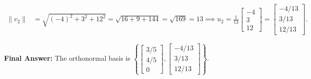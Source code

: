 \documentclass[11pt, letterpaper]{article}
\theoremstyle{definition}
\theoremstyle{remark}
\begin{document}
\begin{enumerate}[label=\textbf{Step \arabic*:}]
\begin{align*}
        \|v_2\| &= \sqrt{(-4)^2 + 3^2 + 12^2} = \sqrt{16 + 9 + 144} = \sqrt{169} = 13 \implies u_2 = \frac{1}{13}\begin{bmatrix} -4 \\ 3 \\ 12 \end{bmatrix} = \begin{bmatrix} -4/13 \\ 3/13 \\ 12/13 \end{bmatrix}.
    \end{align*}
\end{enumerate}
\textbf{Final Answer:} The orthonormal basis is $\left\{ \begin{bmatrix} 3/5 \\ 4/5 \\ 0 \end{bmatrix}, \begin{bmatrix} -4/13 \\ 3/13 \\ 12/13 \end{bmatrix} \right\}$.

\vspace{0.8em}
\end{document}
